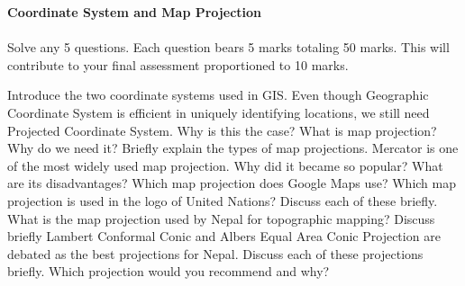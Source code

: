 \documentclass{exam}
\begin{document}
\textbf {Coordinate System and Map Projection} \\
\\
Solve any 5 questions. Each question bears 5 marks totaling 50 marks. This will contribute to your final assessment proportioned to 10 marks.
\begin{questions}
\question Introduce the two coordinate systems used in GIS. Even though Geographic Coordinate System is efficient in uniquely identifying locations, we still need Projected Coordinate System. Why is this the case?
\question What is map projection? Why do we need it? Briefly explain the types of map projections.  
\question Mercator is one of the most widely used map projection. Why did it became so popular? What are its disadvantages?
\question Which map projection does Google Maps use? Which map projection is used in the logo of United Nations? Discuss each of these briefly.
\question What is the map projection used by Nepal for topographic mapping? Discuss briefly 
\question Lambert Conformal Conic and Albers Equal Area Conic Projection are debated as the best projections for Nepal. Discuss each of these projections briefly. Which projection would you recommend and why? 

\end{questions}
\end{document}
